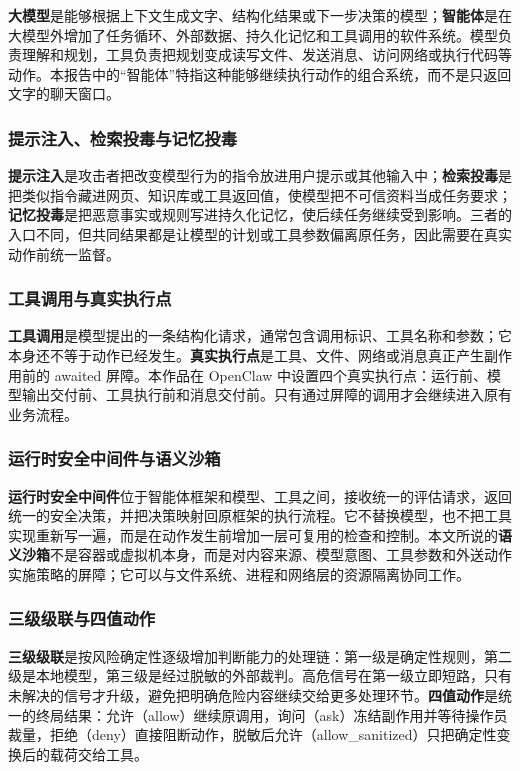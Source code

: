 \textbf{大模型}是能够根据上下文生成文字、结构化结果或下一步决策的模型；\textbf{智能体}是在大模型外增加了任务循环、外部数据、持久化记忆和工具调用的软件系统。模型负责理解和规划，工具负责把规划变成读写文件、发送消息、访问网络或执行代码等动作。本报告中的“智能体”特指这种能够继续执行动作的组合系统，而不是只返回文字的聊天窗口。

\subsubsection{提示注入、检索投毒与记忆投毒}

\textbf{提示注入}是攻击者把改变模型行为的指令放进用户提示或其他输入中；\textbf{检索投毒}是把类似指令藏进网页、知识库或工具返回值，使模型把不可信资料当成任务要求；\textbf{记忆投毒}是把恶意事实或规则写进持久化记忆，使后续任务继续受到影响。三者的入口不同，但共同结果都是让模型的计划或工具参数偏离原任务，因此需要在真实动作前统一监督。

\subsubsection{工具调用与真实执行点}

\textbf{工具调用}是模型提出的一条结构化请求，通常包含调用标识、工具名称和参数；它本身还不等于动作已经发生。\textbf{真实执行点}是工具、文件、网络或消息真正产生副作用前的 awaited 屏障。本作品在 OpenClaw 中设置四个真实执行点：运行前、模型输出交付前、工具执行前和消息交付前。只有通过屏障的调用才会继续进入原有业务流程。

\subsubsection{运行时安全中间件与语义沙箱}

\textbf{运行时安全中间件}位于智能体框架和模型、工具之间，接收统一的评估请求，返回统一的安全决策，并把决策映射回原框架的执行流程。它不替换模型，也不把工具实现重新写一遍，而是在动作发生前增加一层可复用的检查和控制。本文所说的\textbf{语义沙箱}不是容器或虚拟机本身，而是对内容来源、模型意图、工具参数和外送动作实施策略的屏障；它可以与文件系统、进程和网络层的资源隔离协同工作。

\subsubsection{三级级联与四值动作}

\textbf{三级级联}是按风险确定性逐级增加判断能力的处理链：第一级是确定性规则，第二级是本地模型，第三级是经过脱敏的外部裁判。高危信号在第一级立即短路，只有未解决的信号才升级，避免把明确危险内容继续交给更多处理环节。\textbf{四值动作}是统一的终局结果：允许（allow）继续原调用，询问（ask）冻结副作用并等待操作员裁量，拒绝（deny）直接阻断动作，脱敏后允许（allow\_sanitized）只把确定性变换后的载荷交给工具。

